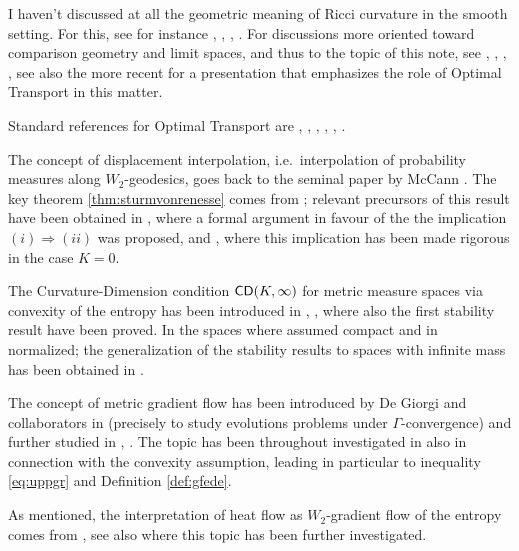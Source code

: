 \documentclass[11pt]{article}
\numberwithin{equation}{section}
\newcommand{\CD}{{\sf CD}}
\begin{document}
{\footnotesize{I haven't discussed at all the geometric meaning of Ricci curvature in the smooth setting. For this, see for instance \cite{Chavel06}, \cite{Li12}, \cite{Petersen16}, \cite{Jost17}. For discussions more oriented toward comparison geometry and limit spaces, and thus to the topic of this note, see \cite{Gromov07}, \cite{ChEb08}, \cite{Cheegersurvey}, \cite{Wei07}, see also the more recent \cite{Villani09} for a presentation that emphasizes the role of Optimal Transport in this matter.


Standard references for Optimal Transport are  \cite{AmbrosioGigliSavare08}, \cite{Villani09}, \cite{G11}, \cite{Santambrogio15}, \cite{FigGla21}, \cite{AmbBruSem21}.

The concept of displacement interpolation, i.e.\ interpolation of probability measures along $W_2$-geodesics, goes back to the seminal paper by McCann    \cite{McCann97}. The key theorem \ref{thm:sturmvonrenesse} comes from \cite{vRS05}; relevant  precursors of this result have been obtained in \cite{OV00}, where a formal argument in favour of the the implication $(i)\Rightarrow(ii)$ was proposed, and \cite{CEMCS01}, where this implication has been made rigorous in the case $K=0$.


The Curvature-Dimension condition $\CD(K,\infty)$ for metric measure spaces via convexity of the entropy has been introduced in \cite{Lott-Villani09}, \cite{Sturm06I}, where also the first stability result have been proved. In \cite{Lott-Villani09} the spaces where assumed compact and in \cite{Sturm06I} normalized; the generalization of the stability results to spaces with infinite mass has been obtained in \cite{Villani09}.








The concept of metric gradient flow  has been introduced by De Giorgi and collaborators in \cite{DeGiorgiMarinoTosques80} (precisely to study evolutions problems under $\Gamma$-convergence) and further studied in \cite{DeGiorgi92}, \cite{DeGiorgi93}. The topic has been throughout investigated in \cite{AmbrosioGigliSavare08}  also in connection with the convexity assumption, leading in particular to inequality \eqref{eq:uppgr} and Definition \ref{def:gfede}.

As mentioned, the interpretation of heat flow as $W_2$-gradient flow of the entropy comes from \cite{JKO98}, see also \cite{Otto01} where this topic has been further investigated.

}}
\end{document}
